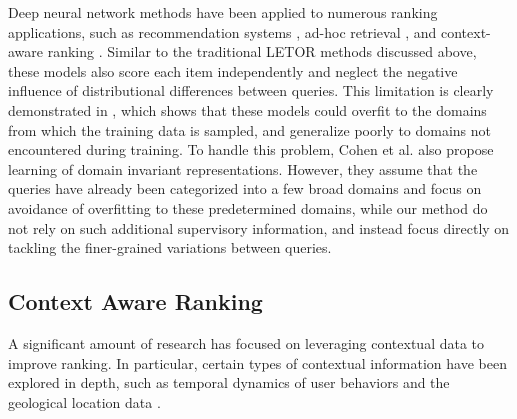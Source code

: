 \documentclass[letterpaper]{article} %
\begin{document}
Deep neural network methods have been applied to numerous ranking applications, such as recommendation systems \cite{covington2016deep}, ad-hoc retrieval \cite{fan2018modeling,zamani2018neural}, and context-aware ranking \cite{zamani2017situational}. Similar to the traditional LETOR methods discussed above, these models also score each item independently and neglect the negative influence of distributional differences between queries. This limitation is clearly demonstrated in \cite{cohen2018cross}, which shows that these models could overfit to the domains from which the training data is sampled, and generalize poorly to domains not encountered during training. To handle this problem, Cohen et al. also propose learning of domain invariant representations. However, they assume that the queries have already been categorized into a few broad domains and focus on avoidance of overfitting to these predetermined domains, while our method do not rely on such additional supervisory information, and instead focus directly on tackling the finer-grained variations between queries.

\subsection{Context Aware Ranking}

A significant amount of research has focused on leveraging contextual data to improve ranking. In
particular, certain types of contextual information have been explored in depth, such as temporal dynamics of user behaviors \cite{xiang2010context,chen2018sequential,ATRANK} and the geological location data \cite{zamani2017situational,manotumruksa2018contextual}.
\end{document}
